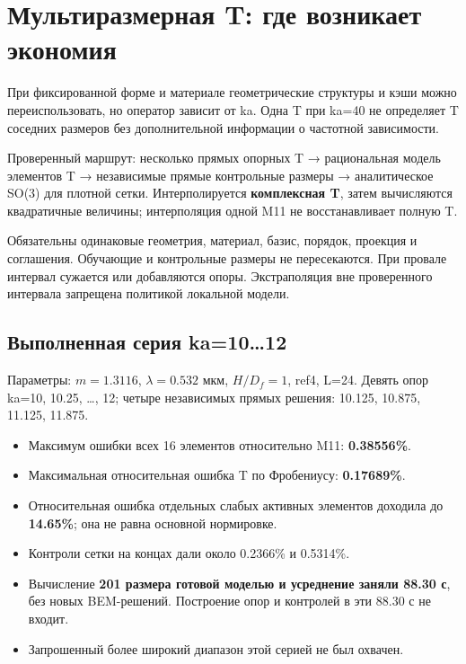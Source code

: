 \documentclass[
  russian,
  11pt,
  a4paper,
]{report}
\providecommand{\tightlist}{%
  \setlength{\itemsep}{0pt}\setlength{\parskip}{0pt}}
\begin{document}
\chapter{Мультиразмерная T: где возникает
экономия}\label{ux43cux443ux43bux44cux442ux438ux440ux430ux437ux43cux435ux440ux43dux430ux44f-t-ux433ux434ux435-ux432ux43eux437ux43dux438ux43aux430ux435ux442-ux44dux43aux43eux43dux43eux43cux438ux44f}

При фиксированной форме и материале геометрические структуры и кэши
можно переиспользовать, но оператор зависит от ka. Одна T при ka=40 не
определяет T соседних размеров без дополнительной информации о частотной
зависимости.

Проверенный маршрут: несколько прямых опорных T → рациональная модель
элементов T → независимые прямые контрольные размеры → аналитическое
SO(3) для плотной сетки. Интерполируется \textbf{комплексная T}, затем
вычисляются квадратичные величины; интерполяция одной M11 не
восстанавливает полную T.

Обязательны одинаковые геометрия, материал, базис, порядок, проекция и
соглашения. Обучающие и контрольные размеры не пересекаются. При провале
интервал сужается или добавляются опоры. Экстраполяция вне проверенного
интервала запрещена политикой локальной модели.

\section{Выполненная серия
ka=10\ldots12}\label{ux432ux44bux43fux43eux43bux43dux435ux43dux43dux430ux44f-ux441ux435ux440ux438ux44f-ka1012}

Параметры: \(m=1.3116\), \(\lambda=0.532\) мкм, \textbf{\(H/D_f=1\)},
ref4, L=24. Девять опор ka=10, 10.25, \ldots, 12; четыре независимых
прямых решения: 10.125, 10.875, 11.125, 11.875.

\begin{itemize}
\tightlist
\item
  Максимум ошибки всех 16 элементов относительно M11:
  \textbf{0.38556\%}.
\item
  Максимальная относительная ошибка T по Фробениусу: \textbf{0.17689\%}.
\item
  Относительная ошибка отдельных слабых активных элементов доходила до
  \textbf{14.65\%}; она не равна основной нормировке.
\item
  Контроли сетки на концах дали около 0.2366\% и 0.5314\%.
\item
  Вычисление \textbf{201 размера готовой моделью и усреднение заняли
  88.30 с}, без новых BEM-решений. Построение опор и контролей в эти
  88.30 с не входит.
\item
  Запрошенный более широкий диапазон этой серией не был охвачен.
\end{itemize}
\end{document}

